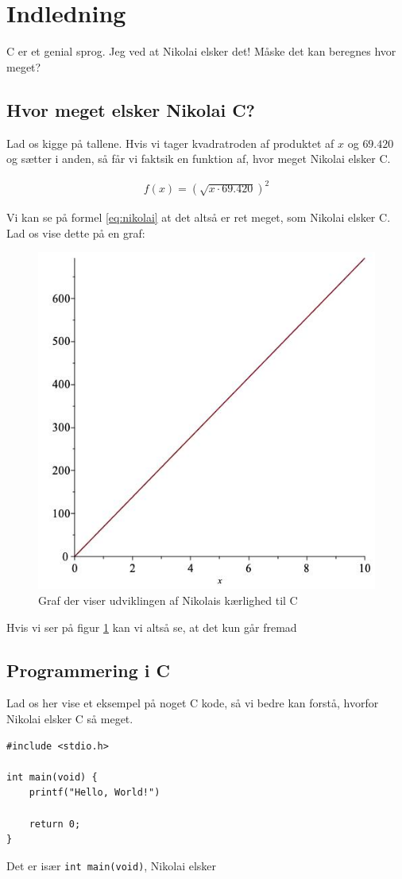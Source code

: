 \section{Indledning}
C er et genial sprog\cite{C-bog}. Jeg ved at Nikolai elsker det! Måske det kan beregnes hvor meget?

\subsection{Hvor meget elsker Nikolai C?}
Lad os kigge på tallene. Hvis vi tager kvadratroden af produktet af $x$ og $69.420$ og sætter i anden, så får vi faktsik en funktion af, hvor meget Nikolai elsker C.

\begin{gather}
    \label{eq:nikolai}
    f(x) = (\sqrt{x \cdot 69.420})^2
\end{gather}

Vi kan se på formel \ref{eq:nikolai} at det altså er ret meget, som Nikolai elsker C. Lad os vise dette på en graf:

\begin{figure}[h!]
    \centering
    \includegraphics[width=0.8\linewidth]{Figurer/Nikolai-c.jpg}
    \caption{Graf der viser udviklingen af Nikolais kærlighed til C}
    \label{fig:nikolai-c}
\end{figure}

\noindent %
Hvis vi ser på figur \ref{fig:nikolai-c} kan vi altså se, at det kun går fremad

\subsection{Programmering i C}
Lad os her vise et eksempel på noget C kode, så vi bedre kan forstå, hvorfor Nikolai elsker C så meget.

\begin{verbatim}
#include <stdio.h>

int main(void) {
    printf("Hello, World!")
    
    return 0;
}
\end{verbatim}


\noindent
Det er især \texttt{int main(void)}, Nikolai elsker